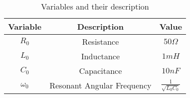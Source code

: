 \begin{table}[h]
\renewcommand\thetable{1}
    \centering
    \begin{tabular}{|c|c|c|}
    \hline
     Variable & Description&Value\\\hline
        $R_0$ & Resistance & $50\Omega$ \\\hline
        $L_0$ & Inductance & $1mH$ \\\hline
        $C_0$ & Capacitance & $10nF$\\\hline
        $\omega_0$& Resonant Angular Frequency & $\frac{1}{\sqrt{L_0C_0}}$\\\hline
    \end{tabular}
    \caption{Variables and their description}
    \label{tab_22_33_1}
\end{table}
